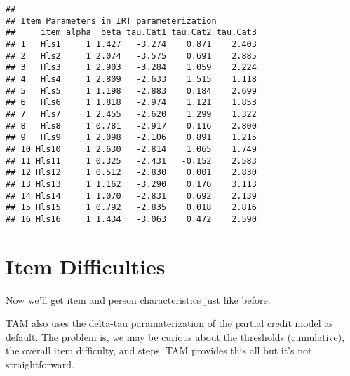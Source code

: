 \documentclass[
]{book}
\newenvironment{Shaded}{\begin{snugshade}}{\end{snugshade}}
\newcommand{\CommentTok}[1]{\textcolor[rgb]{0.56,0.35,0.01}{\textit{#1}}}
\newcommand{\FunctionTok}[1]{\textcolor[rgb]{0.00,0.00,0.00}{#1}}
\newcommand{\NormalTok}[1]{#1}
\newcommand{\OtherTok}[1]{\textcolor[rgb]{0.56,0.35,0.01}{#1}}
\newcommand{\SpecialCharTok}[1]{\textcolor[rgb]{0.00,0.00,0.00}{#1}}
\begin{document}
\begin{verbatim}
## 
## Item Parameters in IRT parameterization
##     item alpha  beta tau.Cat1 tau.Cat2 tau.Cat3
## 1   Hls1     1 1.427   -3.274    0.871    2.403
## 2   Hls2     1 2.074   -3.575    0.691    2.885
## 3   Hls3     1 2.903   -3.284    1.059    2.224
## 4   Hls4     1 2.809   -2.633    1.515    1.118
## 5   Hls5     1 1.198   -2.883    0.184    2.699
## 6   Hls6     1 1.818   -2.974    1.121    1.853
## 7   Hls7     1 2.455   -2.620    1.299    1.322
## 8   Hls8     1 0.781   -2.917    0.116    2.800
## 9   Hls9     1 2.098   -2.106    0.891    1.215
## 10 Hls10     1 2.630   -2.814    1.065    1.749
## 11 Hls11     1 0.325   -2.431   -0.152    2.583
## 12 Hls12     1 0.512   -2.830    0.001    2.830
## 13 Hls13     1 1.162   -3.290    0.176    3.113
## 14 Hls14     1 1.070   -2.831    0.692    2.139
## 15 Hls15     1 0.792   -2.835    0.018    2.816
## 16 Hls16     1 1.434   -3.063    0.472    2.590
\end{verbatim}

\hypertarget{item-difficulties-1}{%
\section{Item Difficulties}\label{item-difficulties-1}}

Now we'll get item and person characteristics just like before.

TAM also uses the delta-tau paramaterization of the partial credit model as default. The problem is, we may be curious about the thresholds (cumulative), the overall item difficulty, and steps. TAM provides this all but it's not straightforward.

\begin{Shaded}
\end{Shaded}
\end{document}
